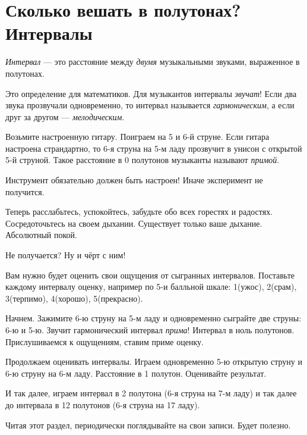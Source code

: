 \section{Сколько вешать в полутонах? Интервалы}
\label{ch:harmony:interval}

\begin{Definition}[Интервал]
    \emph{Интервал} --- это расстояние между \emph{двумя} музыкальными звуками, выраженное в полутонах. 
\end{Definition}

Это определение для математиков. Для музыкантов интервалы \emph{звучат}! Если два звука прозвучали одновременно, то интервал называется \emph{гармоническим}, а если друг за другом --- \emph{мелодическим}.

\begin{Example}
    \label{ex:harmony:interval:string5and6}
    Возьмите настроенную гитару. Поиграем на 5 и 6-й струне. Если гитара настроена страндартно, то 6-я струна на 5-м ладу прозвучит в унисон с открытой 5-й струной. Такое расстояние в 0 полутонов музыканты называют \emph{примой}. 
    
    Инструмент обязательно должен быть настроен! Иначе эксперимент не получится.
    
    Теперь расслабьтесь, успокойтесь, забудьте обо всех горестях и радостях. Сосредоточьтесь на своем дыхании. Существует только ваше дыхание. Абсолютный покой. 
    
    Не получается? Ну и чёрт с ним!

    Вам нужно будет оценить свои ощущения от сыгранных интервалов. Поставьте каждому интервалу оценку, например по 5-и балльной шкале: 1(ужос), 2(срам), 3(терпимо), 4(хорошо), 5(прекрасно).
    
    Начнем. Зажимите 6-ю струну на 5-м ладу и одновременно сыграйте две струны: 6-ю и 5-ю. Звучит гармонический интервал \emph{прима}! Интервал в ноль полутонов. Прислушиваемся к ощущениям, ставим приме оценку.
    
    Продолжаем оценивать интервалы. Играем одновременно 5-ю открытую струну и 6-ю струну на 6-м ладу. Расстояние в 1 полутон. Оценивайте результат.
    
    И так далее, играем интервал в 2 полутона (6-я струна на 7-м ладу) и так далее до интервала в 12 полутонов (6-я струна на 17 ладу). 
    
    Читая этот раздел, периодически поглядывайте на свои записи. Будет полезно.
\end{Example}

